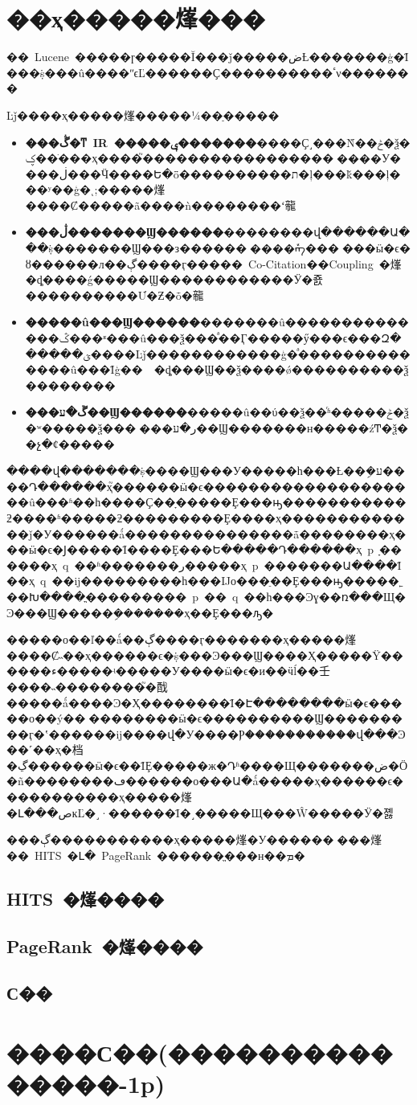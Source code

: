 \section{��ҳ�����㷨���}

��~Lucene~�����ɼ�����Ĭ���ǰ�����ضȽ�������ģ�Ϊ���ṩ���û����ʺϵĽ������Ҫ����������ٴν�������

Ŀǰ����ҳ�����㷨�����¼��ַ���\cite{web_rank_algorithm}��

\begin{itemize}
  \item \textbf{���ڴ�ͳ~IR~�����ݷ�������}����Ҫ˼���Ǹ��ݲ�ѯ�ؼ��ֺ���ҳ����֮�����������������򣬰����У����ڶ���Ӵ����Ե�ȫ����������ת�ļ���ǩ���ļ���ʸ��ģ�ͺ;�����㷨����Ȼ�����ã����ǹ��������ʻ㡣
  \item \textbf{���ڷ�������Ϣ������}��������վ������Ա���ṩ�������Ϣ���з������򣬱����ܽᡢ���ࡢ���ӹ�ϵ�ȣ������л��ڳ����ӷ�����~Co-Citation��Coupling~�㷨�ȡ����ǵ�����Ϣ������������Ӱ�죬����������Ư�Ƶ�ȱ�㡣
  \item \textbf{�����û���Ϣ������}�������û��������������ݣ���ʶ���û���ѯ���ͣ��Ӷ�����ӳ���ϵ���Զ������ؽ����Ŀǰ������������ģ�ͣ��������������û���Ϊģ��~\cite{web_rank_algorithm_1}~�ȡ���Ϣ��ѯ����ǿ����������ѯ��������
  \item \textbf{���ڱ�ע��Ϣ������}�����û��ύ��ѯ��ͬʱ�����ݲ�ѯ�ʷ�����ѯ���򲹳���ر�ע��Ϣ�������н�����źͲ�ѯ��չ�ȼ�����
\end{itemize}

����վ�������ṩ����Ϣ���У�����һ���Ƚ��ܹ�ע����Դ������ҳ֮������ӹ�ϵ��������������������û���ʱ��һ����Ҫ��ָ�����Ȩ���ԣ�����������ƻ����ʱ�����ƻ���������Ȩ����ҳ�������������ǰ�У������ǻ���������������ǡ��������ҳ���ӹ�ϵ�Ϳ�����Ϊ����Ȩ���Ե�����Դ������ҳ~p~ָ������ҳ~q~��ʱ�������ر�����ҳ~p~�������Ա����Ϊ��ҳ~q~��ĳ���������һ���Ĳο���ֵ��Ȩ���ԣ�����˿��Խ����ֳ���������~p~��~q~��һ���Ͽɣ��ռ���Щ�Ͽ���Ϣ�����ܹ�������ҳ��Ȩ���ԡ�

�����о��ľ��ǻ��ڳ����ӷ�������ҳ�����㷨����Ȼ˵��ҳ������ϵ�ṩ���Ͽ���Ϣ����Ҳ�����Ÿ������ء�����ʵ�����У����ӹ�ϵ�и��ӵĺ��壬����˵��������֮�䣬�����ǻ����Ͽ�Ҳ��������Ϊ�Է��������ӹ�ϵ�����о��ý��׽��������ӹ�ϵ����������Ϣ���������ӷ�ʽ������ĳ����վ�У����Ⲣ�����������վ���Ͽ��˹��ҳ�档�ڲ������ӹ�ϵ��ΪȨ�����ж�Դʱ����Щ�������ض�Ӧ�ñ��������ڡ������о���Ա�ǻ�����ҳ������ϵ�����������ҳ�����㷨�Լ���صĸĽ�˼·������Ϊ�˼�����Щ���Ŵ�����Ӱ�졣

���ڳ�����������ҳ�����㷨�У���������㷨��~HITS~�Լ�~PageRank~������ֱ���н��ܡ�

\subsection{HITS~�㷨����}

\subsection{PageRank~�㷨����}

\subsection{С��}

\section{����С��(���������������-1p)}
